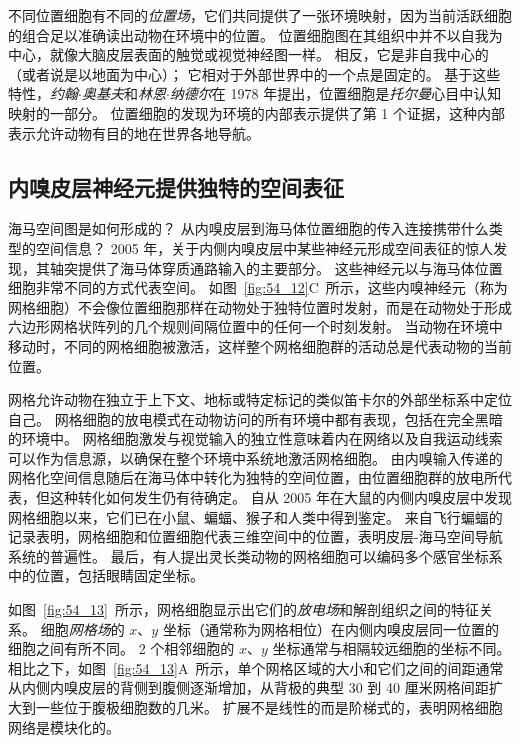 不同位置细胞有不同的\textit{位置场}，它们共同提供了一张环境映射，因为当前活跃细胞的组合足以准确读出动物在环境中的位置。
位置细胞图在其组织中并不以自我为中心，就像大脑皮层表面的触觉或视觉神经图一样。
相反，它是非自我中心的（或者说是以地面为中心）；
它相对于外部世界中的一个点是固定的。
基于这些特性，\textit{约翰$\cdot$奥基夫}和\textit{林恩$\cdot$纳德尔}在 1978 年提出，位置细胞是\textit{托尔曼}心目中认知映射的一部分。
位置细胞的发现为环境的内部表示提供了第 1 个证据，这种内部表示允许动物有目的地在世界各地导航。



\subsection{内嗅皮层神经元提供独特的空间表征}

海马空间图是如何形成的？
从内嗅皮层到海马体位置细胞的传入连接携带什么类型的空间信息？
2005 年，关于内侧内嗅皮层中某些神经元形成空间表征的惊人发现，其轴突提供了海马体穿质通路输入的主要部分。
这些神经元以与海马体位置细胞非常不同的方式代表空间。
如图~\ref{fig:54_12}C~所示，这些内嗅神经元（称为网格细胞）不会像位置细胞那样在动物处于独特位置时发射，而是在动物处于形成六边形网格状阵列的几个规则间隔位置中的任何一个时刻发射。
当动物在环境中移动时，不同的网格细胞被激活，这样整个网格细胞群的活动总是代表动物的当前位置。


网格允许动物在独立于上下文、地标或特定标记的类似笛卡尔的外部坐标系中定位自己。
网格细胞的放电模式在动物访问的所有环境中都有表现，包括在完全黑暗的环境中。
网格细胞激发与视觉输入的独立性意味着内在网络以及自我运动线索可以作为信息源，以确保在整个环境中系统地激活网格细胞。
由内嗅输入传递的网格化空间信息随后在海马体中转化为独特的空间位置，由位置细胞群的放电所代表，但这种转化如何发生仍有待确定。
自从 2005 年在大鼠的内侧内嗅皮层中发现网格细胞以来，它们已在小鼠、蝙蝠、猴子和人类中得到鉴定。
来自飞行蝙蝠的记录表明，网格细胞和位置细胞代表三维空间中的位置，表明皮层-海马空间导航系统的普遍性。
最后，有人提出灵长类动物的网格细胞可以编码多个感官坐标系中的位置，包括眼睛固定坐标。


如图~\ref{fig:54_13}~所示，网格细胞显示出它们的\textit{放电场}和解剖组织之间的特征关系。
细胞\textit{网格场}的 $x$、$y$ 坐标（通常称为网格相位）在内侧内嗅皮层同一位置的细胞之间有所不同。
2 个相邻细胞的 $x$、$y$ 坐标通常与相隔较远细胞的坐标不同。
相比之下，如图~\ref{fig:54_13}A~所示，单个网格区域的大小和它们之间的间距通常从内侧内嗅皮层的背侧到腹侧逐渐增加，从背极的典型 30 到 40 厘米网格间距扩大到一些位于腹极细胞数的几米。
扩展不是线性的而是阶梯式的，表明网格细胞网络是模块化的。


